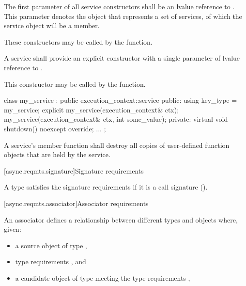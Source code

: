 \pnum
The first parameter of all service constructors shall be an lvalue reference to . This parameter denotes the  object that represents a set of services, of which the service object will be a member. \begin{note} These constructors may be called by the  function. \end{note}

\pnum
A service shall provide an explicit constructor with a single parameter of lvalue reference to . \begin{note} This constructor may be called by the  function. \end{note}

\pnum
\begin{example}

\begin{codeblock}
class my_service : public execution_context::service
{
public:
  using key_type = my_service;
  explicit my_service(execution_context& ctx);
  my_service(execution_context& ctx, int some_value);
private:
  virtual void shutdown() noexcept override;
  ...
};
\end{codeblock}

\end{example}

\pnum
A service's  member function shall destroy all copies of user-defined function objects that are held by the service.



[async.reqmts.signature]{Signature requirements}

%
%
\pnum
A type satisfies the signature requirements if it is a call signature ().



[async.reqmts.associator]{Associator requirements}

%
%
\pnum
An associator defines a relationship between different types and objects where, given:

\begin{itemize}
\item
a source object  of type ,

\item
type requirements , and

\item
a candidate object  of type  meeting the type requirements ,
\end{itemize}

